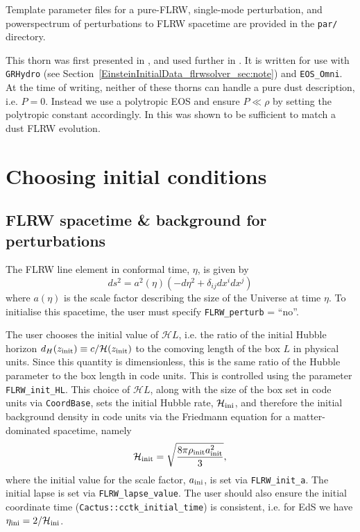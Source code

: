 Template parameter files for a pure-FLRW, single-mode perturbation, and powerspectrum of perturbations to FLRW spacetime are provided in the {\tt par/} directory. 

This thorn was first presented in \cite{EinsteinInitialData_flrwsolver_macpherson2017}, and used further in \cite{EinsteinInitialData_flrwsolver_macpherson2019}. It is written for use with {\tt GRHydro} (see Section~\ref{EinsteinInitialData_flrwsolver_sec:note}) and {\tt EOS\_Omni}. At the time of writing, neither of these thorns can handle a pure dust description, i.e. $P=0$. Instead we use a polytropic EOS and ensure $P\ll\rho$ by setting the polytropic constant accordingly. In \cite{EinsteinInitialData_flrwsolver_macpherson2017} this was shown to be sufficient to match a dust FLRW evolution.




\section{Choosing initial conditions}

\subsection{FLRW spacetime \& background for perturbations} \label{EinsteinInitialData_flrwsolver_sec:FLRWinit}

The FLRW line element in conformal time, $\eta$, is given by
\begin{equation}\label{EinsteinInitialData_flrwsolver_eq:FLRWmetric}
	ds^2 = a^2(\eta) \left( - d\eta^2 + \delta_{ij}dx^i dx^j \right)
\end{equation}
where $a(\eta)$ is the scale factor describing the size of the Universe at time $\eta$. To initialise this spacetime, the user must specify \texttt{FLRW\_perturb} = ``no''. 

The user chooses the initial value of $\mathcal{H}L$, i.e. the ratio of the initial Hubble horizon $d_H(z_{\rm init})\equiv c/\mathcal{H}(z_{\rm init})$ to the comoving length of the box $L$ in physical units. Since this quantity is dimensionless, this is the same ratio of the Hubble parameter to the box length in code units. This is controlled using the parameter \texttt{FLRW\_init\_HL}. 
This choice of $\mathcal{H}L$, along with the size of the box set in code units via \texttt{CoordBase}, sets the initial Hubble rate, $\mathcal{H}_{\rm ini}$, and therefore the initial background density in code units via the Friedmann equation for a matter-dominated spacetime, namely
\begin{equation}
	\mathcal{H}_{\rm init} = \sqrt{\frac{8\pi \rho_{\rm init} a_{\rm init}^2}{3}},
\end{equation}
where the initial value for the scale factor, $a_{\rm ini}$, is set via \texttt{FLRW\_init\_a}. The initial lapse is set via \texttt{FLRW\_lapse\_value}. The user should also ensure the initial coordinate time (\texttt{Cactus::cctk\_initial\_time}) is consistent, i.e. for EdS we have $\eta_{\rm ini} = 2/\mathcal{H}_{\rm ini}$.

